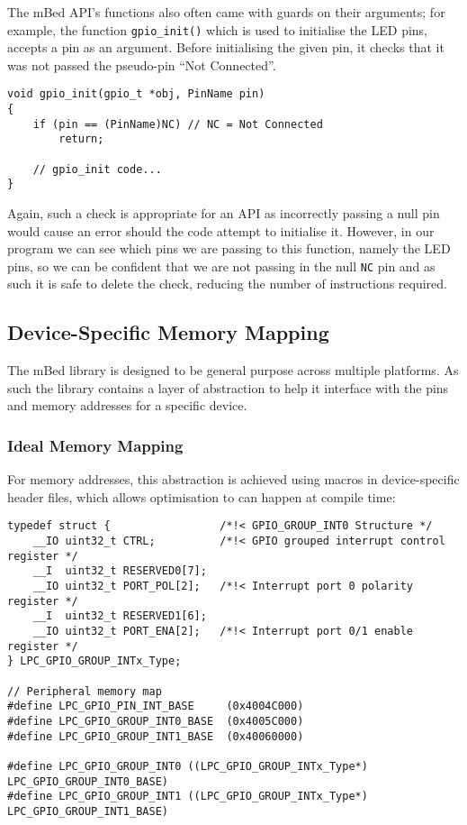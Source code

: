 The mBed API's functions also often came with guards on their arguments; for example, the function \verb|gpio_init()| which is used to initialise the LED pins, accepts a pin as an argument. Before initialising the given pin, it checks that it was not passed the pseudo-pin ``Not Connected''.

\begin{lstlisting}[caption={Argument Guards of gpio init}]
void gpio_init(gpio_t *obj, PinName pin)
{
    if (pin == (PinName)NC) // NC = Not Connected
        return;

    // gpio_init code...
}
\end{lstlisting}

Again, such a check is appropriate for an API as incorrectly passing a null pin would cause an error should the code attempt to initialise it. However, in our program we can see which pins we are passing to this function, namely the LED pins, so we can be confident that we are not passing in the null \verb|NC| pin and as such it is safe to delete the check, reducing the number of instructions required.

\subsection{Device-Specific Memory Mapping}

The mBed library is designed to be general purpose across multiple platforms. As such the library contains a layer of abstraction to help it interface with the pins and memory addresses for a specific device.

\subsubsection{Ideal Memory Mapping}\label{section:constant-memory-map}

For memory addresses, this abstraction is achieved using macros in device-specific header files, which allows optimisation to can happen at compile time:

\begin{lstlisting}[caption={Memory spaces mapped in LPC11Uxx.h}]
typedef struct {                 /*!< GPIO_GROUP_INT0 Structure */
    __IO uint32_t CTRL;          /*!< GPIO grouped interrupt control register */
    __I  uint32_t RESERVED0[7];
    __IO uint32_t PORT_POL[2];   /*!< Interrupt port 0 polarity register */
    __I  uint32_t RESERVED1[6];
    __IO uint32_t PORT_ENA[2];   /*!< Interrupt port 0/1 enable register */
} LPC_GPIO_GROUP_INTx_Type;

// Peripheral memory map
#define LPC_GPIO_PIN_INT_BASE     (0x4004C000)
#define LPC_GPIO_GROUP_INT0_BASE  (0x4005C000)
#define LPC_GPIO_GROUP_INT1_BASE  (0x40060000)

#define LPC_GPIO_GROUP_INT0 ((LPC_GPIO_GROUP_INTx_Type*) LPC_GPIO_GROUP_INT0_BASE)
#define LPC_GPIO_GROUP_INT1 ((LPC_GPIO_GROUP_INTx_Type*) LPC_GPIO_GROUP_INT1_BASE)
\end{lstlisting}

